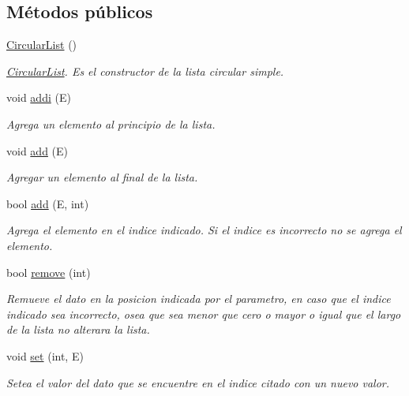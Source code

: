 \subsection*{Métodos públicos}
\begin{DoxyCompactItemize}
\item 
\hypertarget{classCircularList_aad23571a808ede6fc0432dca645ab2ca}{\hyperlink{classCircularList_aad23571a808ede6fc0432dca645ab2ca}{Circular\-List} ()}\label{classCircularList_aad23571a808ede6fc0432dca645ab2ca}

\begin{DoxyCompactList}\small\item\em \hyperlink{classCircularList}{Circular\-List}. Es el constructor de la lista circular simple. \end{DoxyCompactList}\item 
void \hyperlink{classCircularList_a6de0a0af406c738b95b0a6d898b69f8e}{addi} (E)
\begin{DoxyCompactList}\small\item\em Agrega un elemento al principio de la lista. \end{DoxyCompactList}\item 
void \hyperlink{classCircularList_a892b493309f36fb083fdd257388cfa36}{add} (E)
\begin{DoxyCompactList}\small\item\em Agregar un elemento al final de la lista. \end{DoxyCompactList}\item 
bool \hyperlink{classCircularList_af184d3ac2e3bba683a44a6cc19392b12}{add} (E, int)
\begin{DoxyCompactList}\small\item\em Agrega el elemento en el indice indicado. Si el indice es incorrecto no se agrega el elemento. \end{DoxyCompactList}\item 
bool \hyperlink{classCircularList_a4a6acfd818a0ae9055957ec80258c60a}{remove} (int)
\begin{DoxyCompactList}\small\item\em Remueve el dato en la posicion indicada por el parametro, en caso que el indice indicado sea incorrecto, osea que sea menor que cero o mayor o igual que el largo de la lista no alterara la lista. \end{DoxyCompactList}\item 
void \hyperlink{classCircularList_aa54489e11ad76bf929f92b1dce97a3a3}{set} (int, E)
\begin{DoxyCompactList}\small\item\em Setea el valor del dato que se encuentre en el indice citado con un nuevo valor. \end{DoxyCompactList}\item 

\end{DoxyCompactItemize}
